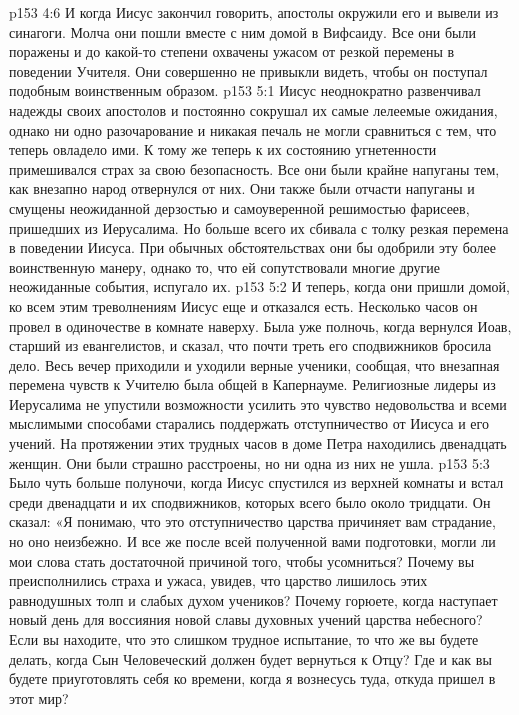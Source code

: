 \vs p153 4:6 И когда Иисус закончил говорить, апостолы окружили его и вывели из синагоги. Молча они пошли вместе с ним домой в Вифсаиду. Все они были поражены и до какой\hyp{}то степени охвачены ужасом от резкой перемены в поведении Учителя. Они совершенно не привыкли видеть, чтобы он поступал подобным воинственным образом.
\vs p153 5:1 Иисус неоднократно развенчивал надежды своих апостолов и постоянно сокрушал их самые лелеемые ожидания, однако ни одно разочарование и никакая печаль не могли сравниться с тем, что теперь овладело ими. К тому же теперь к их состоянию угнетенности примешивался страх за свою безопасность. Все они были крайне напуганы тем, как внезапно народ отвернулся от них. Они также были отчасти напуганы и смущены неожиданной дерзостью и самоуверенной решимостью фарисеев, пришедших из Иерусалима. Но больше всего их сбивала с толку резкая перемена в поведении Иисуса. При обычных обстоятельствах они бы одобрили эту более воинственную манеру, однако то, что ей сопутствовали многие другие неожиданные события, испугало их.
\vs p153 5:2 И теперь, когда они пришли домой, ко всем этим треволнениям Иисус еще и отказался есть. Несколько часов он провел в одиночестве в комнате наверху. Была уже полночь, когда вернулся Иоав, старший из евангелистов, и сказал, что почти треть его сподвижников бросила дело. Весь вечер приходили и уходили верные ученики, сообщая, что внезапная перемена чувств к Учителю была общей в Капернауме. Религиозные лидеры из Иерусалима не упустили возможности усилить это чувство недовольства и всеми мыслимыми способами старались поддержать отступничество от Иисуса и его учений. На протяжении этих трудных часов в доме Петра находились двенадцать женщин. Они были страшно расстроены, но ни одна из них не ушла.
\vs p153 5:3 Было чуть больше полуночи, когда Иисус спустился из верхней комнаты и встал среди двенадцати и их сподвижников, которых всего было около тридцати. Он сказал: «Я понимаю, что это отступничество царства причиняет вам страдание, но оно неизбежно. И все же после всей полученной вами подготовки, могли ли мои слова стать достаточной причиной того, чтобы усомниться? Почему вы преисполнились страха и ужаса, увидев, что царство лишилось этих равнодушных толп и слабых духом учеников? Почему горюете, когда наступает новый день для воссияния новой славы духовных учений царства небесного? Если вы находите, что это слишком трудное испытание, то что же вы будете делать, когда Сын Человеческий должен будет вернуться к Отцу? Где и как вы будете приуготовлять себя ко времени, когда я вознесусь туда, откуда пришел в этот мир?
